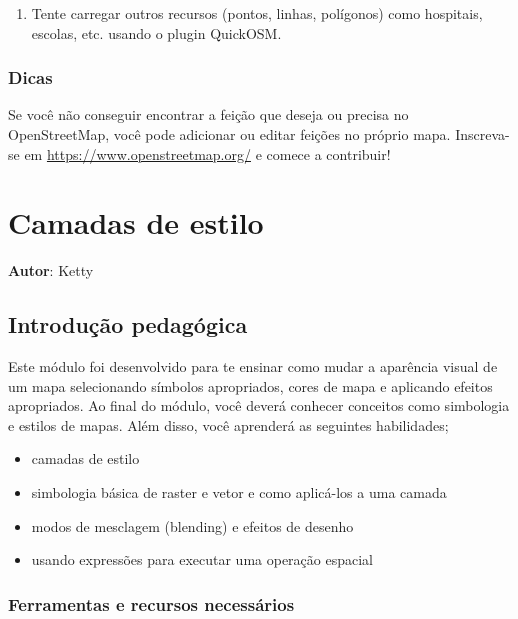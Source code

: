 \documentclass[
  portuguese,
]{krantz}
\providecommand{\tightlist}{%
  \setlength{\itemsep}{0pt}\setlength{\parskip}{0pt}}
\begin{document}
\begin{enumerate}
\def\labelenumi{\arabic{enumi}.}
\tightlist
\item
  Tente carregar outros recursos (pontos, linhas, polígonos) como hospitais, escolas, etc. usando o plugin QuickOSM.
\end{enumerate}

\hypertarget{dicas-1}{%
\subsection{Dicas}\label{dicas-1}}

Se você não conseguir encontrar a feição que deseja ou precisa no OpenStreetMap, você pode adicionar ou editar feições no próprio mapa. Inscreva-se em \url{https://www.openstreetmap.org/} e comece a contribuir!

\hypertarget{camadas-de-estilo}{%
\chapter{Camadas de estilo}\label{camadas-de-estilo}}

\textbf{Autor}: Ketty

\hypertarget{introduuxe7uxe3o-pedaguxf3gica-4}{%
\section{Introdução pedagógica}\label{introduuxe7uxe3o-pedaguxf3gica-4}}

Este módulo foi desenvolvido para te ensinar como mudar a aparência visual de um mapa selecionando símbolos apropriados, cores de mapa e aplicando efeitos apropriados. Ao final do módulo, você deverá conhecer conceitos como simbologia e estilos de mapas. Além disso, você aprenderá as seguintes habilidades;

\begin{itemize}
\tightlist
\item
  camadas de estilo
\item
  simbologia básica de raster e vetor e como aplicá-los a uma camada
\item
  modos de mesclagem (blending) e efeitos de desenho
\item
  usando expressões para executar uma operação espacial
\end{itemize}

\hypertarget{ferramentas-e-recursos-necessuxe1rios-4}{%
\subsection{Ferramentas e recursos necessários}\label{ferramentas-e-recursos-necessuxe1rios-4}}
\end{document}
